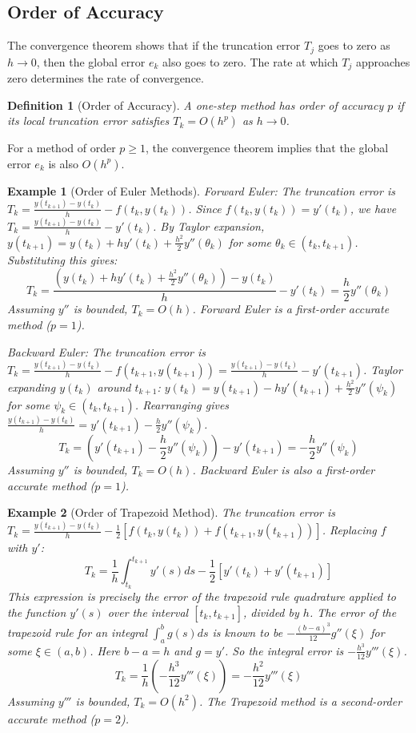 \documentclass{article}
\newtheorem{definition}{Definition}
\newtheorem{example}{Example}
\begin{document}
\subsection{Order of Accuracy}
The convergence theorem shows that if the truncation error $T_j$ goes to zero as $h \to 0$, then the global error $e_k$ also goes to zero. The rate at which $T_j$ approaches zero determines the rate of convergence.

\begin{definition}[Order of Accuracy]
A one-step method has order of accuracy $p$ if its local truncation error satisfies $T_k = O(h^p)$ as $h \to 0$.
\end{definition}
For a method of order $p \ge 1$, the convergence theorem implies that the global error $e_k$ is also $O(h^p)$.

\begin{example}[Order of Euler Methods]
\textit{Forward Euler:} The truncation error is $T_k = \frac{y(t_{k+1}) - y(t_k)}{h} - f(t_k, y(t_k))$. Since $f(t_k, y(t_k)) = y'(t_k)$, we have $T_k = \frac{y(t_{k+1}) - y(t_k)}{h} - y'(t_k)$. By Taylor expansion, $y(t_{k+1}) = y(t_k) + h y'(t_k) + \frac{h^2}{2} y''( \theta_k)$ for some $\theta_k \in (t_k, t_{k+1})$. Substituting this gives:
\[
T_k = \frac{(y(t_k) + h y'(t_k) + \frac{h^2}{2} y''(\theta_k)) - y(t_k)}{h} - y'(t_k) = \frac{h}{2} y''(\theta_k)
\]
Assuming $y''$ is bounded, $T_k = O(h)$. Forward Euler is a first-order accurate method ($p=1$).

\textit{Backward Euler:} The truncation error is $T_k = \frac{y(t_{k+1}) - y(t_k)}{h} - f(t_{k+1}, y(t_{k+1})) = \frac{y(t_{k+1}) - y(t_k)}{h} - y'(t_{k+1})$. Taylor expanding $y(t_k)$ around $t_{k+1}$: $y(t_k) = y(t_{k+1}) - h y'(t_{k+1}) + \frac{h^2}{2} y''(\psi_k)$ for some $\psi_k \in (t_k, t_{k+1})$. Rearranging gives $\frac{y(t_{k+1}) - y(t_k)}{h} = y'(t_{k+1}) - \frac{h}{2} y''(\psi_k)$.
\[
T_k = (y'(t_{k+1}) - \frac{h}{2} y''(\psi_k)) - y'(t_{k+1}) = -\frac{h}{2} y''(\psi_k)
\]
Assuming $y''$ is bounded, $T_k = O(h)$. Backward Euler is also a first-order accurate method ($p=1$).
\end{example}

\begin{example}[Order of Trapezoid Method]
The truncation error is $T_k = \frac{y(t_{k+1}) - y(t_k)}{h} - \frac{1}{2} [f(t_k, y(t_k)) + f(t_{k+1}, y(t_{k+1}))]$. Replacing $f$ with $y'$:
\[
T_k = \frac{1}{h} \int_{t_k}^{t_{k+1}} y'(s) ds - \frac{1}{2} [y'(t_k) + y'(t_{k+1})]
\]
This expression is precisely the error of the trapezoid rule quadrature applied to the function $y'(s)$ over the interval $[t_k, t_{k+1}]$, divided by $h$. The error of the trapezoid rule for an integral $\int_a^b g(s) ds$ is known to be $-\frac{(b-a)^3}{12} g''(\xi)$ for some $\xi \in (a, b)$. Here $b-a = h$ and $g = y'$. So the integral error is $-\frac{h^3}{12} y'''(\xi)$.
\[
T_k = \frac{1}{h} \left( -\frac{h^3}{12} y'''(\xi) \right) = -\frac{h^2}{12} y'''(\xi)
\]
Assuming $y'''$ is bounded, $T_k = O(h^2)$. The Trapezoid method is a second-order accurate method ($p=2$).
\end{example}
\end{document}
